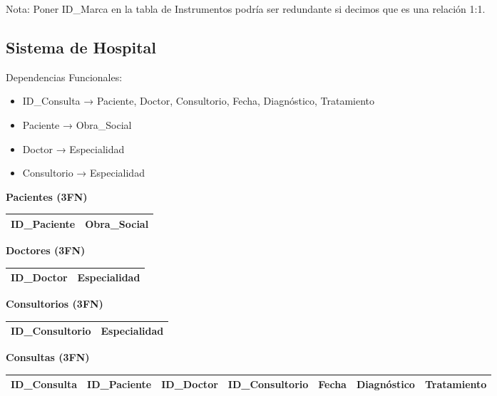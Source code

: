 \documentclass[12pt]{article}
\begin{document}
Nota: Poner ID\_Marca en la tabla de Instrumentos podría ser redundante si decimos que es una relación 1:1.

\subsection{Sistema de Hospital}

Dependencias Funcionales:
\begin{itemize}
    \item ID\_Consulta → Paciente, Doctor, Consultorio, Fecha, Diagnóstico, Tratamiento
    \item Paciente → Obra\_Social
    \item Doctor → Especialidad
    \item Consultorio → Especialidad
\end{itemize}

\textbf{Pacientes (3FN)}
\begin{center}
\begin{tabular}{|l|l|}
\hline
ID\_Paciente & Obra\_Social \\
\hline
\end{tabular}
\end{center}

\textbf{Doctores (3FN)}
\begin{center}
\begin{tabular}{|l|l|}
\hline
ID\_Doctor & Especialidad \\
\hline
\end{tabular}
\end{center}

\textbf{Consultorios (3FN)}
\begin{center}
\begin{tabular}{|l|l|}
\hline
ID\_Consultorio & Especialidad \\
\hline
\end{tabular}
\end{center}

\textbf{Consultas (3FN)}
{\small
\begin{center}
\begin{tabular}{|l|l|l|l|l|l|l|}
\hline
ID\_Consulta & ID\_Paciente & ID\_Doctor & ID\_Consultorio & Fecha & Diagnóstico & Tratamiento \\
\hline
\end{tabular}
\end{center}
}
\end{document}
